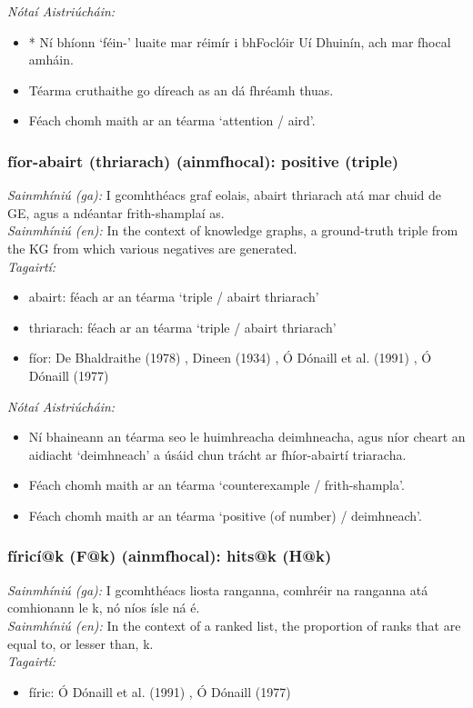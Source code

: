  \noindent \textit{Nótaí Aistriúcháin:}
\begin{itemize}
	\item * Ní bhíonn `féin-' luaite mar réimír i bhFoclóir Uí Dhuinín, ach mar fhocal amháin.
	\item Téarma cruthaithe go díreach as an dá fhréamh thuas.
	\item Féach chomh maith ar an téarma `attention / aird'.
\end{itemize}


\subsubsection*{fíor-abairt (thriarach) (ainmfhocal): positive (triple)}
 \noindent \textit{Sainmhíniú (ga):} I gcomhthéacs graf eolais, abairt thriarach atá mar chuid de GE, agus a ndéantar frith-shamplaí as.
\\
 \noindent \textit{Sainmhíniú (en):} In the context of knowledge graphs, a ground-truth triple from the KG from which various negatives are generated.
\\
 \noindent \textit{Tagairtí:}
\begin{itemize}
	\item abairt: féach ar an téarma `triple / abairt thriarach'
	\item thriarach: féach ar an téarma `triple / abairt thriarach'
	\item fíor: De Bhaldraithe (1978) \cite{de-bhaldraithe}, Dineen (1934) \cite{dineen}, Ó Dónaill et al. (1991) \cite{focloir-beag}, Ó Dónaill (1977) \cite{odonaill}
\end{itemize}

 \noindent \textit{Nótaí Aistriúcháin:}
\begin{itemize}
	\item Ní bhaineann an téarma seo le huimhreacha deimhneacha, agus níor cheart an aidiacht `deimhneach' a úsáid chun trácht ar fhíor-abairtí triaracha.
	\item Féach chomh maith ar an téarma `counterexample / frith-shampla'.
	\item Féach chomh maith ar an téarma `positive (of number) / deimhneach'.
\end{itemize}


\subsubsection*{fíricí@k (F@k) (ainmfhocal): hits@k (H@k)}
 \noindent \textit{Sainmhíniú (ga):} I gcomhthéacs liosta ranganna, comhréir na ranganna atá comhionann le k, nó níos ísle ná é.
\\
 \noindent \textit{Sainmhíniú (en):} In the context of a ranked list, the proportion of ranks that are equal to, or lesser than, k.
\\
 \noindent \textit{Tagairtí:}
\begin{itemize}
	\item fíric: Ó Dónaill et al. (1991) \cite{focloir-beag}, Ó Dónaill (1977) \cite{odonaill}
\end{itemize}

